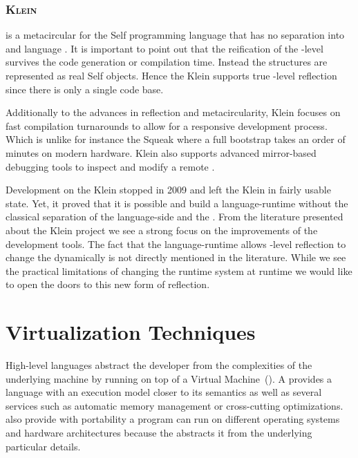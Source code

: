 \subsubsection*{\textsc{Klein \VM}}

 is a metacircular \VM for the Self programming language that has no separation into \VM and language \cite{Unga05a}.
It is important to point out that the reification of the \VM-level survives the code generation or compilation time.
Instead the \VM structures are represented as real Self objects.
Hence the Klein \VM supports true \VM-level reflection since there is only a single code base.

Additionally to the advances in reflection and metacircularity, Klein focuses on fast compilation turnarounds to allow for a responsive development process.
Which is unlike for instance the Squeak \VM where a full \VM bootstrap takes an order of minutes on modern hardware.
Klein also supports advanced mirror-based debugging tools to inspect and modify a remote \VM.

Development on the Klein \VM stopped in 2009 and left the Klein \VM in fairly usable state.
Yet, it proved that it is possible and build a language-runtime without the classical separation of the language-side and the \VM.
From the literature presented about the Klein project we see a strong focus on the improvements of the development tools.
The fact that the language-runtime allows \VM-level reflection to change the \VM dynamically is not directly mentioned in the literature.
While we see the practical limitations of changing the \VM runtime system at runtime we would like to open the doors to this new form of reflection.

\section{Virtualization Techniques}

High-level languages abstract the developer from the complexities of the underlying machine by running on top of a Virtual Machine~(\VM). A \VM provides a language with an execution model closer to its semantics as well as several services such as automatic memory management or cross-cutting optimizations. \VMs also provide with portability \ie a program can run on different operating systems and hardware architectures because the \VM abstracts it from the underlying particular details.

